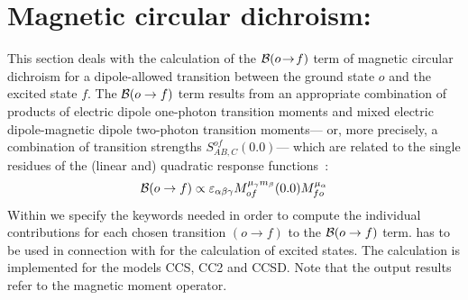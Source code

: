 
\section{Magnetic circular dichroism: }\label{sec:ccmcd}

This section deals with the calculation of the 
${\cal{B}}(o\!\to\!f)$ term of magnetic circular dichroism
for a dipole-allowed transition between the ground state $o$ and 
the excited state $f$.
The ${\cal{B}}(o\to f)$ term results from an appropriate combination of
products of electric dipole one-photon transition moments
and mixed electric dipole-magnetic dipole
two-photon transition moments---
or, more precisely, a combination of transition strengths
$S_{AB,C}^{of}(0.0)$---
which are related to the single residues of the (linear and) 
quadratic response functions~\cite{Coriani:MCDRSP,Coriani:MOACC,Coriani:PHD}:
\[
{\cal{B}}(o\to f) \propto \varepsilon_{\alpha\beta\gamma} 
        M^{\mu_\gamma m_\beta}_{of}(0.0)M^{\mu_\alpha}_{fo}
\]
%
\noindent
Within  we specify the keywords needed in order
to compute the individual 
contributions for each chosen transition $(o\to f)$ to the
${\cal{B}}(o\to f)$ term.  has to be used in 
connection with  for the calculation of 
excited states.
The calculation is implemented for the models CCS, CC2 and CCSD.
Note that the output results refer to the magnetic moment operator.


\begin{center}
\end{center}

